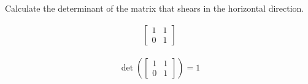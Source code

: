 Calculate the determinant of the matrix that shears in the horizontal direction.

\begin{align*}
    \begin{bmatrix}
        1 & 1 \\
        0 & 1
    \end{bmatrix}
\end{align*}

\begin{solution}
\begin{align*}
    \det \left( \begin{bmatrix}
        1 & 1 \\
        0 & 1
    \end{bmatrix} \right) = 1
\end{align*}
\end{solution}